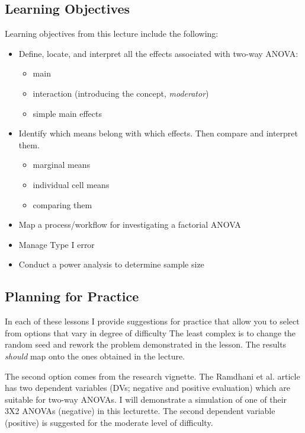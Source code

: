\documentclass[
  11pt,
]{book}
\providecommand{\tightlist}{%
  \setlength{\itemsep}{0pt}\setlength{\parskip}{0pt}}
\begin{document}
\hypertarget{learning-objectives-6}{%
\subsection{Learning Objectives}\label{learning-objectives-6}}

Learning objectives from this lecture include the following:

\begin{itemize}
\tightlist
\item
  Define, locate, and interpret all the effects associated with two-way ANOVA:

  \begin{itemize}
  \tightlist
  \item
    main
  \item
    interaction (introducing the concept, \emph{moderator})
  \item
    simple main effects
  \end{itemize}
\item
  Identify which means belong with which effects. Then compare and interpret them.

  \begin{itemize}
  \tightlist
  \item
    marginal means
  \item
    individual cell means
  \item
    comparing them
  \end{itemize}
\item
  Map a process/workflow for investigating a factorial ANOVA
\item
  Manage Type I error
\item
  Conduct a power analysis to determine sample size
\end{itemize}

\hypertarget{planning-for-practice-5}{%
\subsection{Planning for Practice}\label{planning-for-practice-5}}

In each of these lessons I provide suggestions for practice that allow you to select from options that vary in degree of difficulty The least complex is to change the random seed and rework the problem demonstrated in the lesson. The results \emph{should} map onto the ones obtained in the lecture.

The second option comes from the research vignette. The Ramdhani et al. \citeyearpar{ramdhani_affective_2018} article has two dependent variables (DVs; negative and positive evaluation) which are suitable for two-way ANOVAs. I will demonstrate a simulation of one of their 3X2 ANOVAs (negative) in this lecturette. The second dependent variable (positive) is suggested for the moderate level of difficulty.
\end{document}
